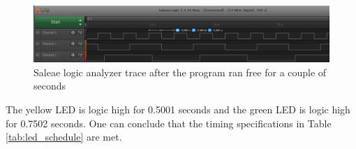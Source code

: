 \begin{figure}[H]
    \centering

    \includegraphics[scale=0.43]{img/SystickScheduler.png}

\caption{Saleae logic analyzer trace after the program ran free for a couple of seconds}
\label{fig:systick_sched_ver}

\end{figure}

The yellow LED is logic high for 0.5001 seconds and the green LED is logic high for 0.7502 seconds.
One can conclude that the timing specifications in Table \ref{tab:led_schedule} are met.
